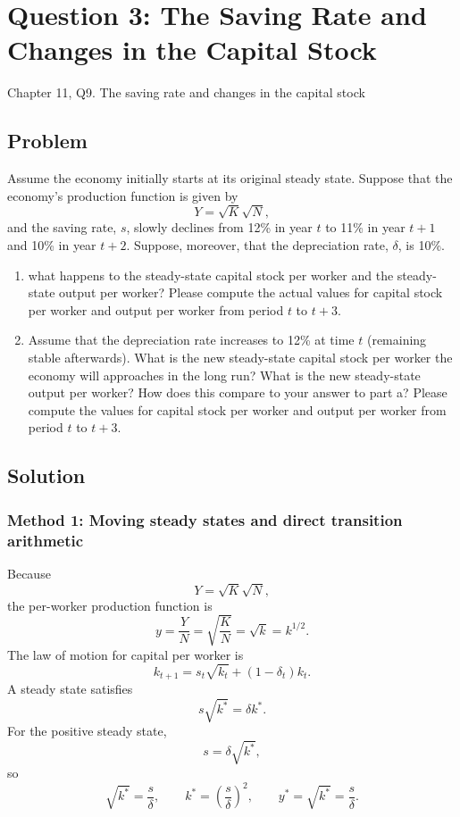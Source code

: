\documentclass[12pt]{article}
\begin{document}
\newpage
\section{Question 3: The Saving Rate and Changes in the Capital Stock}

\noindent
Chapter 11, Q9. The saving rate and changes in the capital stock

\subsection{Problem}
Assume the economy initially starts at its original steady state. Suppose that the economy’s production function is given by
\[
Y = \sqrt{K}\sqrt{N},
\]
and the saving rate, \(s\), slowly declines from 12\% in year \(t\) to 11\% in year \(t + 1\) and 10\% in year \(t + 2\). Suppose, moreover, that the depreciation rate, \(\delta\), is 10\%.

\begin{enumerate}[label=(\alph*)]
    \item what happens to the steady-state capital stock per worker and the steady-state output per worker? Please compute the actual values for capital stock per worker and output per worker from period \(t\) to \(t+3\).
    \item Assume that the depreciation rate increases to 12\% at time \(t\) (remaining stable afterwards). What is the new steady-state capital stock per worker the economy will approaches in the long run? What is the new steady-state output per worker? How does this compare to your answer to part a? Please compute the values for capital stock per worker and output per worker from period \(t\) to \(t+3\).
\end{enumerate}

\subsection{Solution}

\subsubsection{Method 1: Moving steady states and direct transition arithmetic}
Because
\[
Y=\sqrt{K}\sqrt{N},
\]
the per-worker production function is
\[
y=\frac{Y}{N}=\sqrt{\frac{K}{N}}=\sqrt{k}=k^{1/2}.
\]
The law of motion for capital per worker is
\[
k_{t+1}=s_t \sqrt{k_t} + (1-\delta_t)k_t.
\]
A steady state satisfies
\[
s\sqrt{k^*}=\delta k^*.
\]
For the positive steady state,
\[
s=\delta \sqrt{k^*},
\]
so
\[
\sqrt{k^*}=\frac{s}{\delta},
\qquad
k^*=\left(\frac{s}{\delta}\right)^2,
\qquad
y^*=\sqrt{k^*}=\frac{s}{\delta}.
\]
\end{document}
